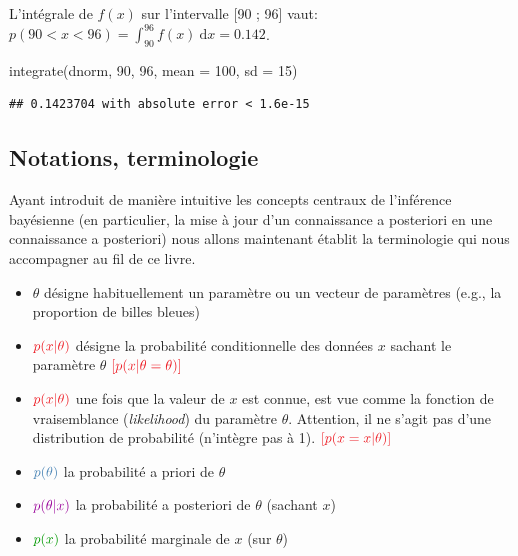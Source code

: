 \documentclass[
  a4paper,11pt,twoside,onecolumn,openright,final,oldfontcommands]{memoir}
\newenvironment{Shaded}{\begin{snugshade}}{\end{snugshade}}
\newcommand{\AttributeTok}[1]{\textcolor[rgb]{0.77,0.63,0.00}{#1}}
\newcommand{\DecValTok}[1]{\textcolor[rgb]{0.00,0.00,0.81}{#1}}
\newcommand{\FunctionTok}[1]{\textcolor[rgb]{0.00,0.00,0.00}{#1}}
\newcommand{\NormalTok}[1]{#1}
\theoremstyle{definition}
\theoremstyle{definition}
\theoremstyle{definition}
\theoremstyle{remark}
\begin{document}
L'intégrale de \(f(x)\) sur l'intervalle {[}90 ; 96{]} vaut: \(p(90 < x < 96) = \int_{90}^{96} f(x) \ \mathrm{d}x = 0.142\).

\begin{Shaded}
\begin{Highlighting}[]
\FunctionTok{integrate}\NormalTok{(dnorm, }\DecValTok{90}\NormalTok{, }\DecValTok{96}\NormalTok{, }\AttributeTok{mean =} \DecValTok{100}\NormalTok{, }\AttributeTok{sd =} \DecValTok{15}\NormalTok{)}
\end{Highlighting}
\end{Shaded}

\begin{verbatim}
## 0.1423704 with absolute error < 1.6e-15
\end{verbatim}

\hypertarget{notations-terminologie}{%
\subsection{Notations, terminologie}\label{notations-terminologie}}

Ayant introduit de manière intuitive les concepts centraux de l'inférence bayésienne (en particulier, la mise à jour d'un connaissance a posteriori en une connaissance a posteriori) nous allons maintenant établit la terminologie qui nous accompagner au fil de ce livre.

\begin{itemize}
\item
  \(\theta\) désigne habituellement un paramètre ou un vecteur de paramètres (e.g., la proportion de billes bleues)
\item
  \(\color{orangered}{p(x\vert \theta)}\) { désigne la probabilité conditionnelle des données \(x\) sachant le paramètre \(\theta\) } \(\color{orangered}{[p(x | \theta = \theta)]}\)
\item
  \(\color{orangered}{p(x\vert \theta)}\) { une fois que la valeur de \(x\) est connue, est vue comme la fonction de vraisemblance (\emph{likelihood}) du paramètre \(\theta\). Attention, il ne s'agit pas d'une distribution de probabilité (n'intègre pas à 1). } \(\color{orangered}{[p(x = x | \theta)]}\)
\item
  \(\color{steelblue}{p(\theta)}\) { la probabilité a priori de \(\theta\)}
\item
  \(\color{purple}{p(\theta \vert x)}\) { la probabilité a posteriori de \(\theta\) (sachant \(x\))}
\item
  \(\color{green}{p(x)}\) { la probabilité marginale de \(x\) (sur \(\theta\))}
\end{itemize}
\end{document}
